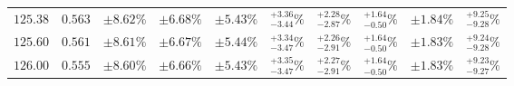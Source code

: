 \begin{table}[ht!]
{{\begin{tabular}{| cc | ccc | cccc | c |}
$125.38$ & $0.563$ & $\pm8.62\%$ & {\color{black!55}$\pm 6.68\%$} & {\color{black!55}$\pm 5.43\%$} & $^{+3.36}_{-3.44}\%$ & {\color{black!55}$^{+2.28}_{-2.87}\%$} & {\color{black!55}$^{+1.64}_{-0.50}\%$} & {\color{black!55}$\pm 1.84\%$} & $^{+9.25}_{-9.28}\%$  \\
$125.60$ & $0.561$ & $\pm8.61\%$ & {\color{black!55}$\pm 6.67\%$} & {\color{black!55}$\pm 5.44\%$} & $^{+3.34}_{-3.47}\%$ & {\color{black!55}$^{+2.26}_{-2.91}\%$} & {\color{black!55}$^{+1.64}_{-0.50}\%$} & {\color{black!55}$\pm 1.83\%$} & $^{+9.24}_{-9.28}\%$  \\
$126.00$ & $0.555$ & $\pm8.60\%$ & {\color{black!55}$\pm 6.66\%$} & {\color{black!55}$\pm 5.43\%$} & $^{+3.35}_{-3.47}\%$ & {\color{black!55}$^{+2.27}_{-2.91}\%$} & {\color{black!55}$^{+1.64}_{-0.50}\%$} & {\color{black!55}$\pm 1.83\%$} & $^{+9.23}_{-9.27}\%$  \\

\end{tabular}}}
\end{table}
